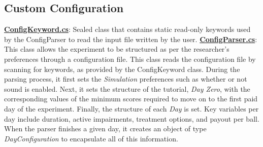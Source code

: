\documentclass{article}
\begin{document}
\subsection{Custom Configuration} 
\href{https://bit.ly/2TWgOwJ}{\textbf{ConfigKeyword.cs}}: Sealed class that contains static read-only keywords used by the ConfigParser to read the input file written by the user. \newline \newline
\href{https://bit.ly/2TZaLYj}{\textbf{ConfigParser.cs}}: This class allows the experiment to be structured as per the researcher's preferences through a configuration file. This class reads the configuration file by scanning for keywords, as provided by the ConfigKeyword class. During the parsing process, it first sets the \textit{Simulation} preferences such as whether or not sound is enabled. Next, it sets the structure of the tutorial, \textit{Day Zero}, with the corresponding values of the minimum scores required to move on to the first paid day of the experiment. Finally, the structure of each \textit{Day} is set. Key variables per day include duration, active impairments, treatment options, and payout per ball. When the parser finishes a given day, it creates an object of type \textit{DayConfiguration} to encapsulate all of this information.
\end{document}
